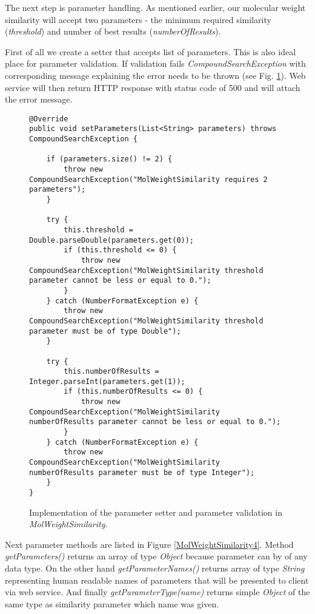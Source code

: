 \documentclass[thesis=M,english]{FITthesis}[2012/10/20]
\begin{document}
The next step is parameter handling. As mentioned earlier, our molecular weight similarity will accept two parameters - the minimum required similarity (\textit{threshold}) and number of best results (\textit{numberOfResults}).  

First of all we create a setter that accepts list of parameters. This is also ideal place for parameter validation. If validation fails \textit{CompoundSearchException} with corresponding message explaining the error needs to be thrown (see Fig. \ref{MolWeightSimilarity3}). Web service will then return HTTP response with status code of 500 and will attach the error message. 

\begin{figure}
\begin{lstlisting}
@Override
public void setParameters(List<String> parameters) throws CompoundSearchException {

    if (parameters.size() != 2) {
        throw new CompoundSearchException("MolWeightSimilarity requires 2 parameters");
    }

    try {
        this.threshold = Double.parseDouble(parameters.get(0));
        if (this.threshold <= 0) {
            throw new CompoundSearchException("MolWeightSimilarity threshold parameter cannot be less or equal to 0.");
        }
    } catch (NumberFormatException e) {
        throw new CompoundSearchException("MolWeightSimilarity threshold parameter must be of type Double");
    }
	
    try {
        this.numberOfResults = Integer.parseInt(parameters.get(1));	
        if (this.numberOfResults <= 0) {
            throw new CompoundSearchException("MolWeightSimilarity numberOfResults parameter cannot be less or equal to 0.");
        }
    } catch (NumberFormatException e) {
        throw new CompoundSearchException("MolWeightSimilarity numberOfResults parameter must be of type Integer");
    }
}

\end{lstlisting}
\caption{Implementation of the parameter setter and parameter validation in \textit{MolWeightSimilarity}.}
\label{MolWeightSimilarity3}
\end{figure}


Next parameter methods are listed in Figure \ref{MolWeightSimilarity4}. Method \textit{getParameters()} returns an array of type \textit{Object} because parameter can by of any data type. On the other hand \textit{getParameterNames()} returns array of type \textit{String} representing human readable names of parameters that will be presented to client via web service.  And finally \textit{getParameterType(name)} returns simple \textit{Object} of the same type as similarity parameter which name was given.
\end{document}

